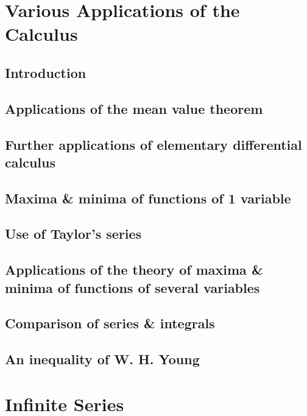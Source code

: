 \documentclass[oneside]{book}
\numberwithin{equation}{section}
\begin{document}
\section{Various Applications of the Calculus}

\subsection{Introduction}

\subsection{Applications of the mean value theorem}

\subsection{Further applications of elementary differential calculus}

\subsection{Maxima \& minima of functions of 1 variable}

\subsection{Use of Taylor's series}

\subsection{Applications of the theory of maxima \& minima of functions of several variables}

\subsection{Comparison of series \& integrals}

\subsection{An inequality of W. H. Young}


\section{Infinite Series}
\end{document}

